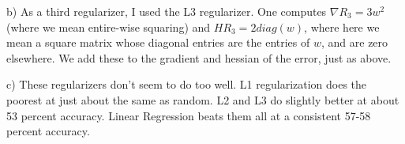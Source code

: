 \documentclass[12pt]{article}
\theoremstyle{plain}
\theoremstyle{definition}
\begin{document}
\begin{enumerate}
b) As a third regularizer, I used the L3 regularizer. One computes $\nabla R_3 = 3 w^2$ (where we mean entire-wise squaring) and $HR_3 = 2 diag(w)$, where here we mean a square matrix whose diagonal entries are the entries of $w$, and are zero elsewhere. We add these to the gradient and hessian of the error, just as above.

c) These regularizers don't seem to do too well. L1 regularization does the poorest at just about the same as random. L2 and L3 do slightly better at about 53 percent accuracy. Linear Regression beats them all at a consistent 57-58 percent accuracy. 


\end{enumerate}
\end{document}
